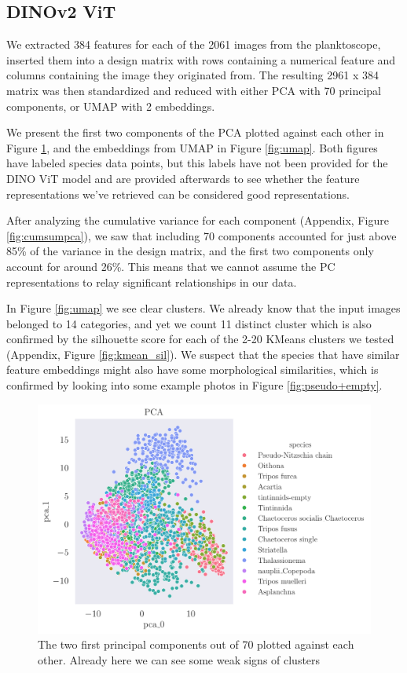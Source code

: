 %
%
\subsection{DINOv2 ViT}
We extracted 384 features for each of the 2061 images from the planktoscope, inserted them into a design matrix with rows containing a numerical feature and columns containing the image they originated from. The resulting 2961 x 384 matrix was then standardized and reduced with either PCA with 70 principal components, or UMAP with 2 embeddings. 

We present the first two components of the PCA plotted against each other in Figure \ref{fig:pca0pca1}, and the embeddings from UMAP in Figure \ref{fig:umap}. Both figures have labeled species data points, but this labels have not been provided for the DINO ViT model and are provided afterwards to see whether the feature representations we've retrieved can be considered good representations.

After analyzing the cumulative variance for each component (Appendix, Figure \ref{fig:cumsumpca}), we saw that including 70 components accounted for just above 85\% of the variance in the design matrix, and the first two components only account for around 26\%. This means that we cannot assume the PC representations to relay significant relationships in our data. 

In Figure \ref{fig:umap} we see clear clusters. We already know that the input images belonged to 14 categories, and yet we count 11 distinct cluster which is also confirmed by the silhouette score for each of the 2-20 KMeans clusters we tested (Appendix, Figure \ref{fig:kmean_sil}). We suspect that the species that have similar feature embeddings might also have some morphological similarities, which is confirmed by looking into some example photos in Figure \ref{fig:pseudo+empty}. 

\begin{figure}[H]
    \centering
    \includegraphics[width=1.1\linewidth]{examples/tests_eb/figs/pca0_pca1.pdf}
    \caption{The two first principal components out of 70 plotted against each other. Already here we can see some weak signs of clusters}
    \label{fig:pca0pca1}
\end{figure}

